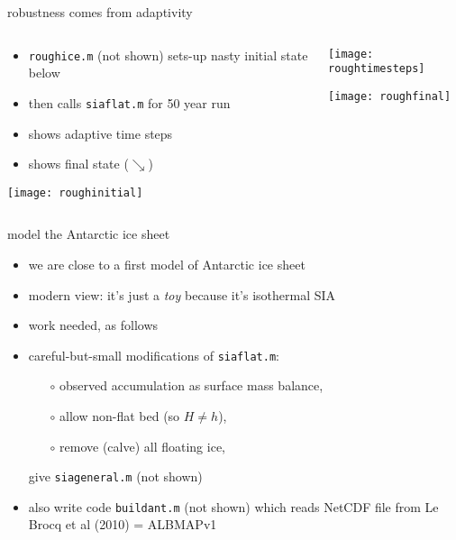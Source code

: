 \begin{frame}{robustness comes from adaptivity}

\begin{columns}
\begin{column}{0.5\textwidth}
\begin{itemize}
\item \texttt{roughice.m} (not shown) sets-up nasty initial state below
\item then calls \texttt{siaflat.m} for 50 year run
\item shows adaptive time steps
\item shows final state ($\searrow$)
\end{itemize}

\vspace{3mm}
\texttt{[image: roughinitial]}
\end{column}
\begin{column}{0.5\textwidth}
\texttt{[image: roughtimesteps]}

\vspace{5mm}
\texttt{[image: roughfinal]}
\end{column}
\end{columns}
\end{frame}


\begin{frame}{model the Antarctic ice sheet}

\begin{itemize}
\item we are close to a first model of Antarctic ice sheet
\item modern view: it's just a \emph{toy} because it's isothermal SIA

\bigskip
\item work needed, as follows
\item careful-but-small modifications of \texttt{siaflat.m}:
  \begin{itemize}
  \item[$\circ$] observed accumulation as surface mass balance,
  \item[$\circ$] allow non-flat bed (so $H\ne h$),
  \item[$\circ$] remove (calve) all floating ice,
  \end{itemize}
give \texttt{siageneral.m} (not shown)
\item also write code \texttt{buildant.m} (not shown) which reads NetCDF file from Le Brocq et al (2010) = ALBMAPv1
\end{itemize}
\end{frame}


